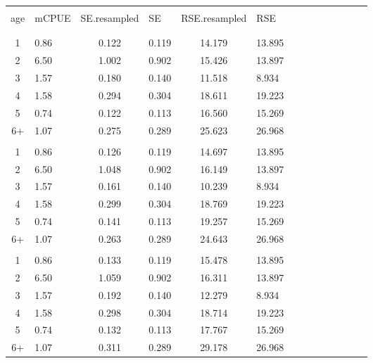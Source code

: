 \documentclass[a4paper 12pt]{article}
\numberwithin{equation}{section}
\begin{document}
\clearpage
 \begin{small}
\begin{table}[h!]
\centering
\setlength\tabcolsep{11.5pt} 
\begin{footnotesize}
\begin{tabular}{clclclclclclcl}
  \hline \\ [0.3ex]
  age & mCPUE  & SE.resampled &  SE & RSE.resampled & RSE \\ [1.0ex]
\hline \\
  \raisebox{1ex}{\bf  1 cm}  \\ [1.0ex]
 1 & 0.86  & 0.122 &0.119  &14.179 & 13.895\\
 2 & 6.50  &1.002  &0.902  &15.426 &13.897\\
 3 & 1.57  & 0.180 &0.140  &11.518 &8.934\\
 4 & 1.58  &0.294  &0.304  &18.611 &19.223\\
 5 &0.74   &0.122  &0.113  &16.560 &15.269\\
 6+&  1.07 & 0.275 & 0.289 & 25.623& 26.968\\[3.5ex]

  \raisebox{1ex}{\bf 2 cm}  \\ [1.0ex]
1 & 0.86 & 0.126 & 0.119  &14.697  & 13.895\\
2 & 6.50 &  1.048 & 0.902 & 16.149 & 13.897\\
3 & 1.57 & 0.161 & 0.140  & 10.239 & 8.934\\
4 & 1.58 & 0.299 & 0.304 & 18.769 & 19.223\\
5 & 0.74 & 0.141 & 0.113 & 19.257 & 15.269\\
6+ &  1.07 & 0.263& 0.289 & 24.643 & 26.968\\[3.5ex]

  \raisebox{1ex}{\bf  3 cm}  \\ [1.0ex]
    
 1  &0.86 &0.133  &0.119 & 15.478 & 13.895 \\
 2  &6.50 &1.059  & 0.902 &16.311 & 13.897\\
 3  &1.57 &0.192  & 0.140 & 12.279 &8.934\\
 4  &1.58 &0.298  &0.304 &18.714  &19.223\\
 5  &0.74 &0.132 & 0.113 &17.767 & 15.269\\
6+  &1.07 &0.311 &0.289 & 29.178 & 26.968\\[3.5ex]


\end{tabular}
\end{footnotesize}
\end{table}
\end{small}
\end{document}
